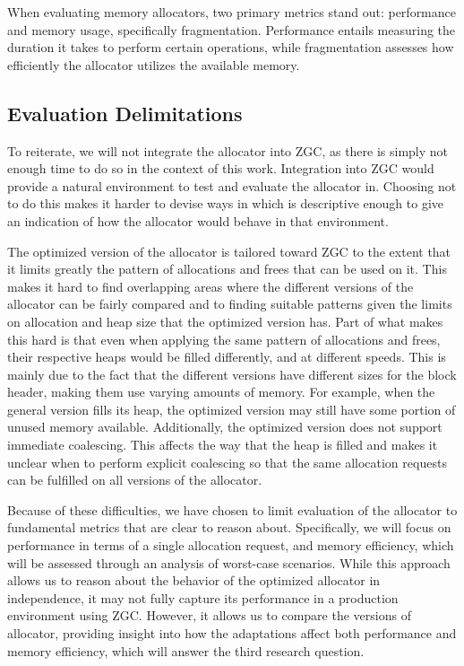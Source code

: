 
When evaluating memory allocators, two primary metrics stand out: performance and memory usage, specifically fragmentation. Performance entails measuring the duration it takes to perform certain operations, while fragmentation assesses how efficiently the allocator utilizes the available memory.

\subsection{Evaluation Delimitations}

To reiterate, we will not integrate the allocator into ZGC, as there is simply not enough time to do so in the context of this work. Integration into ZGC would provide a natural environment to test and evaluate the allocator in. Choosing not to do this makes it harder to devise ways in which is descriptive enough to give an indication of how the allocator would behave in that environment. 

The optimized version of the allocator is tailored toward ZGC to the extent that it limits greatly the pattern of allocations and frees that can be used on it. This makes it hard to find overlapping areas where the different versions of the allocator can be fairly compared and to finding suitable patterns given the limits on allocation and heap size that the optimized version has. Part of what makes this hard is that even when applying the same pattern of allocations and frees, their respective heaps would be filled differently, and at different speeds. This is mainly due to the fact that the different versions have different sizes for the block header, making them use varying amounts of memory. For example, when the general version fills its heap, the optimized version may still have some portion of unused memory available. Additionally, the optimized version does not support immediate coalescing. This affects the way that the heap is filled and makes it unclear when to perform explicit coalescing so that the same allocation requests can be fulfilled on all versions of the allocator.

Because of these difficulties, we have chosen to limit evaluation of the allocator to fundamental metrics that are clear to reason about. Specifically, we will focus on performance in terms of a single allocation request, and memory efficiency, which will be assessed through an analysis of worst-case scenarios. While this approach allows us to reason about the behavior of the optimized allocator in independence, it may not fully capture its performance in a production environment using ZGC. However, it allows us to compare the versions of allocator, providing insight into how the adaptations affect both performance and memory efficiency, which will answer the third research question.

